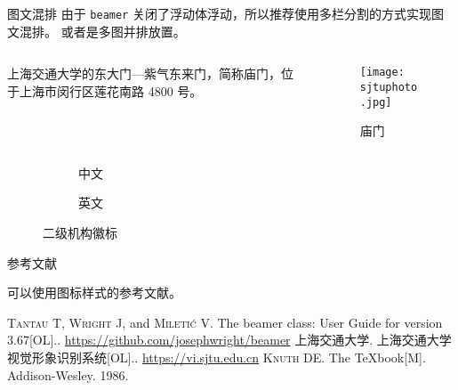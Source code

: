 \documentclass{ctexbeamer}
\begin{document}
\begin{frame}[fragile]
\begin{columns}[T]
\begin{column}{.45\textwidth}
        \begin{stampblock}{图文混排}
          由于 \texttt{beamer} 关闭了浮动体浮动，所以推荐使用多栏分割的方式实现图文混排。
          或者是多图并排放置。
          \begin{columns}
            \begin{column}{0.7\textwidth}
              上海交通大学的东大门---紫气东来门，简称庙门，位于上海市闵行区莲花南路 4800 号。
            \end{column}
            \begin{column}{0.3\textwidth}
              \begin{figure}
                \texttt{[image: sjtuphoto.jpg]}
                \caption{庙门}
              \end{figure}
            \end{column}
          \end{columns}
          \begin{figure}
            \begin{subfigure}{0.4\textwidth}
              \caption{中文}
            \end{subfigure}\hspace*{20pt}
            \begin{subfigure}{0.4\textwidth}
              \caption{英文}
            \end{subfigure}
            \caption{二级机构徽标}
          \end{figure}
        \end{stampblock}
        
        \begin{stampblock}{参考文献}
        
          可以使用图标样式的参考文献。

          \begin{bibliolist}{00}
            \onlineitem \textsc{Tantau T}, \textsc{Wright J}, and \textsc{Mileti\'c V}.\newblock
            The beamer class: User Guide for version 3.67[OL].. \url{https://github.com/josephwright/beamer}
            \articleitem \textsc{上海交通大学}.\newblock
            上海交通大学视觉形象识别系统[OL].. \url{https://vi.sjtu.edu.cn}
            \bookitem \textsc{Knuth DE}.\newblock
            The \TeX{}book[M].\newblock
            Addison-Wesley. 1986.
          \end{bibliolist}


\end{stampblock}
\end{column}
\end{columns}
\end{frame}
\end{document}
